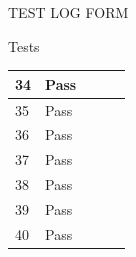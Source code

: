 \documentclass{article}
\begin{document}
\begin{section}{TEST LOG FORM}
\begin{subsection}{Tests}
\begin{tabularx}{\linewidth}{| p{1.5cm} | p{2cm} | p{7.5cm} | p{2cm} | X |}
34
&
Pass
&

&

&

\\
\hline

35
&
Pass
&

&

&

\\
\hline

36
&
Pass
&

&

&

\\
\hline

37
&
Pass
&

&

&

\\
\hline

38
&
Pass
&

&

&

\\
\hline

39
&
Pass
&

&

&

\\
\hline

40
&
Pass
&

&

&

\\
\hline

			\end{tabularx}
		\end{subsection}
	\end{section}
	
	\newpage
	
\end{document}

